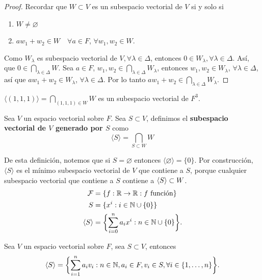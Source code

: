 \documentclass[12pt,a4paper]{book}
\begin{document}
    \begin{proof}
        Recordar que $W\subset V$ es un subespacio vectorial de $V$ si y solo si
        \begin{enumerate}
            \item[(a)] $W\neq\varnothing$
            \item[(b)] $aw_{1}+w_{2}\in W\quad\forall a\in F$, $\forall w_{1},w_{2}\in W$.  
        \end{enumerate}
        Como $W_{\lambda}$ es subespacio vectorial de $V, \forall\lambda\in\Delta$, entonces
        $0\in W_{\lambda}, \forall\lambda\in\Delta$. Así, que $0\in\bigcap_{\lambda\in\Delta}W$.
        Sea $a\in F$, $w_{1},w_{2}\in\bigcap_{\lambda\in\Delta}W_{\lambda}$, entonces $w_{1},w_{2}\in W_{\lambda}$,
        $\forall\lambda\in\Delta$, así que $aw_{1}+w_{2}\in W_{\lambda}$, $\forall\lambda\in\Delta$.
        Por lo tanto $aw_{1}+w_{2}\in\bigcap_{\lambda\in\Delta}W_{\lambda}$.
    \end{proof}

    \begin{ejemplo}
    \label{ej:16}
        $\langle(1,1,1)\rangle=\bigcap_{(1,1,1)\in W}W$ es un subespacio vectorial
        de $F^{3}$.
    \end{ejemplo}

    \begin{definicion}
    \label{def:13}
        Sea $V$ un espacio vectorial sobre $F$. Sea $S\subset V$, definimos el \textbf{subespacio vectorial de
        $V$ generado por $S$} como
        \begin{equation*}
            \langle S \rangle=\bigcap_{S\subset W}W
        \end{equation*}
    \end{definicion}

    De esta definición, notemos que si $S=\varnothing$ entonces $\langle\varnothing\rangle=\{0\}$.
    Por construcción, $\langle S\rangle$ es el mínimo subespacio vectorial de $V$ que contiene
    a $S$, porque cualquier subespacio vectorial que contiene a $S$ contiene a $\langle S \rangle\subset W$.
    \begin{align*}
        \mathcal{F}&=\{f:\mathbb{R}\to\mathbb{R}:f\text{ función}\}\\
        S&=\{x^{i}:i\in\mathbb{N}\cup\{0\}\}\\
        \langle S \rangle&=\biggl\{\sum_{i=0}^{n}a_{i}x^{i}:n\in\mathbb{N}\cup\{0\}\biggr\}.
    \end{align*}

    \begin{proposicion}
    \label{prop:16}
        Sea $V$ un espacio vectorial sobre $F$, sea $S\subset V$, entonces
        \begin{equation*}
            \langle S \rangle=\biggl\{\sum_{i=1}^{n}a_{i}v_{i}:n\in\mathbb{N},a_{i}\in F,v_{i}\in S,\forall i\in\{1,\dots,n\}\biggr\}.
        \end{equation*}
    \end{proposicion}
\end{document}
